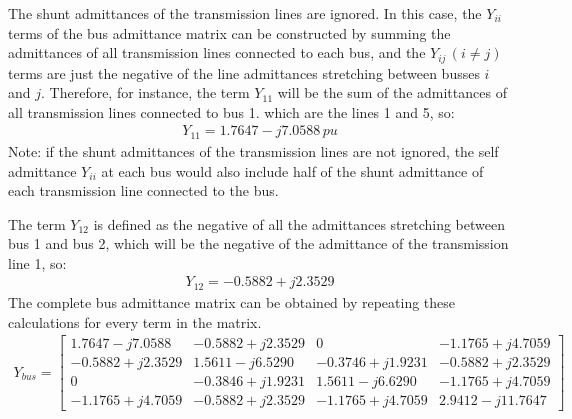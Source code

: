 The shunt admittances of the transmission lines are ignored. In this case, the $Y_{ii}$ terms of the bus admittance matrix can be constructed by summing the admittances of all transmission lines connected to each bus, and the $Y_{ij}\, (i \neq j)$ terms are just the negative of the line admittances stretching between busses $i$ and $j$. Therefore, for instance, the term $Y_{11}$ will be the sum of the admittances of all transmission lines connected to bus 1. which are the lines 1 and 5, so:
\begin{gather}
	Y_{11} = 1.7647 - j7.0588\, \si{pu}
\end{gather}
Note: if the shunt admittances of the transmission lines are not ignored, the self admittance $Y_{ii}$ at each bus would also include half of the shunt admittance of each transmission line connected to the bus.

The term $Y_{12}$ is defined as the negative of all the admittances stretching between bus 1 and bus 2, which will be the negative of the admittance of the transmission line 1, so:
\begin{gather}
	Y_{12} = -0.5882 + j2.3529
\end{gather}
The complete bus admittance matrix can be obtained by repeating these calculations for every term in the matrix.
\begin{gather}
	Y_{bus} = \begin{bmatrix}
		1.7647-j7.0588    & -0.5882 + j2.3529 & 0                 & -1.1765 + j4.7059 \\
		-0.5882 + j2.3529 & 1.5611-j6.5290    & -0.3746 + j1.9231 & -0.5882 + j2.3529 \\
		0                 & -0.3846+j1.9231   & 1.5611-j6.6290    & -1.1765 + j4.7059 \\
		-1.1765+j4.7059   & -0.5882 + j2.3529 & -1.1765 + j4.7059 & 2.9412 - j11.7647
	\end{bmatrix}
\end{gather}
